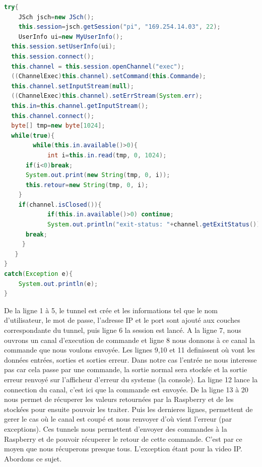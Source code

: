\documentclass[a4paper,11pt]{report}
\begin{document}
			\begin{lstlisting}[language=java]
try{
	JSch jsch=new JSch();
	this.session=jsch.getSession("pi", "169.254.14.03", 22);
	UserInfo ui=new MyUserInfo();
  this.session.setUserInfo(ui);
  this.session.connect();
  this.channel = this.session.openChannel("exec");
  ((ChannelExec)this.channel).setCommand(this.Commande);
  this.channel.setInputStream(null);
  ((ChannelExec)this.channel).setErrStream(System.err);
  this.in=this.channel.getInputStream();
  this.channel.connect();
  byte[] tmp=new byte[1024];
  while(true){
		while(this.in.available()>0){
			int i=this.in.read(tmp, 0, 1024);
      if(i<0)break;
      System.out.print(new String(tmp, 0, i));
      this.retour=new String(tmp, 0, i);
    }
    if(channel.isClosed()){
			if(this.in.available()>0) continue; 
			System.out.println("exit-status: "+channel.getExitStatus());
      break;
     }
   }
}
catch(Exception e){
	System.out.println(e);
}
			\end{lstlisting}
			De la ligne 1 à 5, le tunnel est crée et les informations tel que le nom d'utilisateur, le mot de passe, l'adresse IP et le port sont ajouté aux couches correspondante du tunnel, puis ligne 6 la session est lancé.
		\newline A la ligne 7, nous ouvrons un canal d'execution de commande et ligne 8 nous donnons à ce canal la commande que nous voulons envoyée.
		\newline Les lignes 9,10 et 11 definissent où vont les données entrées, sorties et sorties erreur. Dans notre cas l'entrée ne nous interesse pas car cela passe par une commande, la sortie normal sera stockée et la sortie erreur renvoyé sur l'afficheur d'erreur du systeme (la console). La ligne 12 lance la connection du canal, c'est ici que la commande est envoyée.
		\newline De la ligne 13 à 20 nous permet de récuperer les valeurs retournées par la Raspberry et de les stockées pour ensuite pouvoir les traiter.
		\newline Puis les dernieres lignes, permettent de gerer le cas où le canal est coupé et nous renvoyer d'où vient l'erreur (par exceptions).
		\newline \newline Ces tunnels nous permettent d'envoyer des commandes à la Raspberry et de pouvoir récuperer le retour de cette commande. C'est par ce moyen que nous récuperons presque tous. L'exception étant pour la video IP. Abordons ce sujet.
\end{document}
